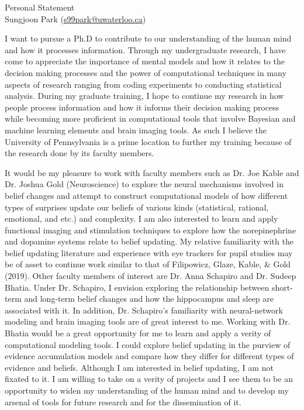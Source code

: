 \documentclass[12pt]{article}
\let\oldcenter\center
\let\oldendcenter\endcenter
\renewenvironment{center}{\setlength\topsep{-1pt}\oldcenter}{\oldendcenter}
\begin{document}
\begin{center}
{\Large Personal Statement} \\
{\normalsize Sungjoon Park (\href{mailto:s99park@uwaterloo.ca}{s99park@uwaterloo.ca})}
\end{center}

I want to pursue a Ph.D to contribute to our understanding of the human mind and how it processes information. Through my undergraduate research, I have come to appreciate the importance of mental models and how it relates to the decision making processes and the power of computational techniques in many aspects of research ranging from coding experiments to conducting statistical analysis. During my graduate training, I hope to continue my research in how people process information and how it informs their decision making process while becoming more proficient in computational tools that involve Bayesian and machine learning elements and brain imaging tools. As such I believe the University of Pennsylvania is a prime location to further my training because of the research done by its faculty members.

It would be my pleasure to work with faculty members such as Dr. Joe Kable and Dr. Joshua Gold (Neuroscience) to explore the neural mechanisms involved in belief changes and attempt to construct computational models of how different types of surprises update our beliefs of various kinds (statistical, rational, emotional, and etc.) and complexity. I am also interested to learn and apply functional imaging and stimulation techniques to explore how the norepinephrine and dopamine systems relate to belief updating. My relative familiarity with the belief updating literature and experience with eye trackers for pupil studies may be of asset to continue work similar to that of Filipowicz, Glaze, Kable, \& Gold (2019). Other faculty members of interest are Dr. Anna Schapiro and Dr. Sudeep Bhatia. Under Dr. Schapiro, I envision exploring the relationship between short-term and long-term belief changes and how the hippocampus and sleep are associated with it. In addition, Dr. Schapiro’s familiarity with neural-network modeling and brain imaging tools are of great interest to me. Working with Dr. Bhatia would be a great opportunity for me to learn and apply a verity of computational modeling tools. I could explore belief updating in the purview of evidence accumulation models and compare how they differ for different types of evidence and beliefs. Although I am interested in belief updating, I am not fixated to it. I am willing to take on a verity of projects and I see them to be an opportunity to widen my understanding of the human mind and to develop my arsenal of tools for future research and for the dissemination of it.
\end{document}
